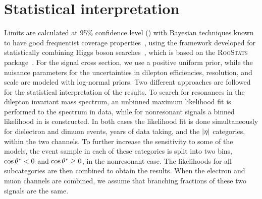 \documentclass[11pt,twoside,a4paper,cmspaper,final,collab]{cms-tdr}
\begin{document}
\section{Statistical interpretation}
\label{sec:interpretation}
Limits are calculated at 95\% confidence level (\CL) with Bayesian techniques known to have good frequentist coverage properties~\cite{PDG2020}, using the framework developed for statistically combining Higgs boson searches~\cite{CMS-NOTE-2011-005}, which is based on the \textsc{RooStats} package~\cite{Moneta:2010pm}. For the signal cross section, we use a positive uniform prior, while the nuisance parameters for the uncertainties in dilepton efficiencies, resolution, and scale are modeled with log-normal priors. Two different approaches are followed for the statistical interpretation of the results. To search for resonances in the dilepton invariant mass spectrum, an unbinned maximum likelihood fit is performed to the \mll spectrum in data, while for nonresonant signals a binned likelihood in \mll is constructed. In both cases the likelihood fit is done simultaneously for dielectron and dimuon events, years of data taking, and the $\lvert \eta \rvert$ categories, within the two channels. To further increase the sensitivity to some of the models, the event sample in each of these categories is split into two bins, $\cos\theta^\ast < 0$ and $\cos\theta^\ast \geq 0$, in the nonresonant case.  The likelihoods for all subcategories are then combined to obtain the results.  When the electron and muon channels are combined, we assume that branching fractions of these two signals are the same.
\end{document}
